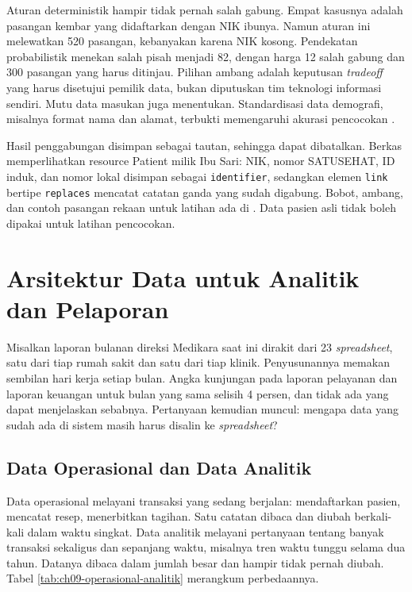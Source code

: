 \begin{pendalaman}[title={Pendalaman Teknis (opsional): Pencocokan Deterministik dan Probabilistik}]
\medskip
Aturan deterministik hampir tidak pernah salah gabung. Empat kasusnya adalah
pasangan kembar yang didaftarkan dengan NIK ibunya. Namun aturan ini
melewatkan 520 pasangan, kebanyakan karena NIK kosong. Pendekatan
probabilistik menekan salah pisah menjadi 82, dengan harga 12 salah gabung
dan 300 pasangan yang harus ditinjau. Pilihan ambang adalah keputusan
\textit{tradeoff} yang harus disetujui pemilik data, bukan diputuskan tim
teknologi informasi sendiri. Mutu data masukan juga menentukan. Standardisasi data demografi,
misalnya format nama dan alamat, terbukti memengaruhi akurasi pencocokan
\cite{c09-grannis2019}.

\medskip
Hasil penggabungan disimpan sebagai tautan, sehingga dapat dibatalkan. Berkas
 memperlihatkan resource
Patient milik Ibu Sari: NIK, nomor SATUSEHAT, ID induk, dan nomor lokal
disimpan sebagai \texttt{identifier}, sedangkan elemen \texttt{link} bertipe
\texttt{replaces} mencatat catatan ganda yang sudah digabung. Bobot, ambang,
dan contoh pasangan rekaan untuk latihan ada di
. Data pasien asli
tidak boleh dipakai untuk latihan pencocokan.
\end{pendalaman}

\section{Arsitektur Data untuk Analitik dan Pelaporan}

Misalkan laporan bulanan direksi Medikara saat ini dirakit dari 23
\textit{spreadsheet}, satu dari tiap rumah sakit dan satu dari tiap klinik.
Penyusunannya memakan sembilan hari kerja setiap bulan. Angka kunjungan pada
laporan pelayanan dan laporan keuangan untuk bulan yang sama selisih 4 persen,
dan tidak ada yang dapat menjelaskan sebabnya. Pertanyaan kemudian muncul:
mengapa data yang sudah ada di sistem masih harus disalin ke \textit{spreadsheet}?

\subsection*{Data Operasional dan Data Analitik}

Data operasional melayani transaksi yang sedang berjalan: mendaftarkan
pasien, mencatat resep, menerbitkan tagihan. Satu catatan dibaca dan diubah
berkali-kali dalam waktu singkat. Data analitik melayani pertanyaan tentang
banyak transaksi sekaligus dan sepanjang waktu, misalnya tren waktu tunggu
selama dua tahun. Datanya dibaca dalam jumlah besar dan hampir tidak pernah
diubah. Tabel \ref{tab:ch09-operasional-analitik} merangkum perbedaannya.

